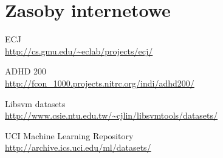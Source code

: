 \chapter*{Zasoby internetowe}\label{sect:web-resources}%

\newcommand{\tturl}{\begingroup \urlstyle{tt}\Url}

{\small
\begin{enumerate}[{[}A{]}]
	\item \label{url:ecj} ECJ \\
		\url{http://cs.gmu.edu/~eclab/projects/ecj/}

	\item \label{url:adhd200} ADHD 200 \\
		\url{	http://fcon_1000.projects.nitrc.org/indi/adhd200/}

	\item \label{url:libsvm} Libsvm datasets \\
		\url{	http://www.csie.ntu.edu.tw/~cjlin/libsvmtools/datasets/}							
	\item \label{url:uci} UCI Machine Learning Repository \\
		\url{http://archive.ics.uci.edu/ml/datasets/}
		
\end{enumerate}
}
